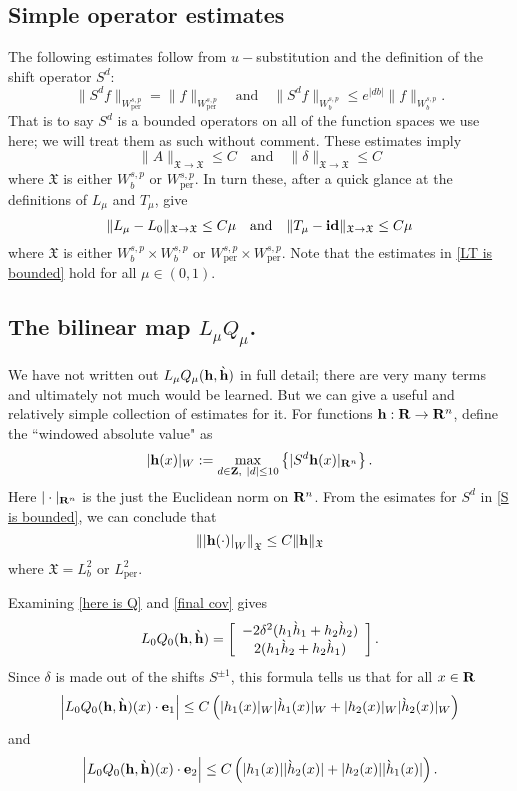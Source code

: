 \documentclass[12pt]{amsart}
\numberwithin{equation}{section}
\newcommand{\per}{{\text{per}}}
\newcommand{\be}{\begin{equation}}
\newcommand{\ee}{\end{equation}}
\newcommand{\mand}{\quad \text{and}\quad}
\newcommand{\R}{{\bf{R}}}
\newcommand{\Z}{{\bf{Z}}}
\newcommand{\hb}{{\bf{h}}}
\newcommand{\hbg}{{\grave{\bf{h}}}}
\newcommand{\hg}{{\grave{h}}}
\newcommand{\jb}{{{\bf{e}}_2}}
\newcommand{\ib}{{{\bf{e}}_1}}
\newcommand{\X}{{\mathfrak{X}}}
\begin{document}
\subsection{Simple operator estimates}
The following estimates follow from $u-$substitution and the definition of the shift operator $S^d$:
\be\label{S is bounded}
\| S^d f\|_{W^{s,p}_\per} 
=
\| f\|_{W^{s,p}_\per} \mand
\| S^d f\|_{W^{s,p}_b} 
\le  e^{|db|}
\| f\|_{W^{s,p}_b}.
\ee
That is to say $S^d$
is a bounded operators on all of the function spaces
we use here; we will treat them as such without comment.
These estimates imply
\be\label{Ad is bounded}
\| A\|_{\X \to \X} \le C
\mand 
\| \delta\|_{\X \to \X} \le C
\ee
where $\X$ is either $W^{s,p}_b$ or $W^{s,p}_\per$. In turn these, after a quick glance at the definitions of $L_\mu$ and $T_\mu$,
give
\be\label{LT is bounded}
\| L_\mu - L_0\|_{\X \to \X} \le C\mu \mand
\| T_\mu - {\bf id}\|_{\X \to \X}\le C\mu
\ee
where $\X$ is either $W^{s,p}_b \times W^{s,p}_b$ or $W^{s,p}_\per \times W^{s,p}_\per$.
Note that the estimates in \eqref{LT is bounded} hold for all $\mu \in (0,1)$.


\subsection{The bilinear map $L_\mu Q_\mu$.}
We have not written out $L_\mu Q_\mu(\hb,\hbg)$ in full detail; 
there are very many terms and ultimately not much would be learned.
But  we can give a useful and relatively simple collection of estimates for it. 
For functions $\hb:\R \to \R^n$, define the ``windowed absolute value" as
$$
|\hb(x)|_W:= \max_{d\in \Z,\ |d| \le 10} \left\{ |S^d\hb(x)|_{\R^n}\right\}.
$$
Here $| \cdot|_{\R^n}$ is the just the Euclidean norm on $\R^n$.
From the esimates for $S^d$ in \eqref{S is bounded}, we can conclude that
\be\label{window 1}
\left \| \left| \hb(\cdot) \right|_W \right \|_{\X} \le C\| \hb \|_{\X}
\ee
where $\X=L^2_b$ or $L^2_\per$.

Examining \eqref{here is Q} and \eqref{final cov}
gives
\be\label{LQ0}
L_0 Q_0(\hb,\hbg) = \left[ \begin{array}{c} -2 \delta^2 (h_1 \hg_1 + h_2 \hg_2) \\
2 (h_1 \hg_2 + h_2 \hg_1)
\end{array}\right].
\ee
Since $\delta$ is made out of the shifts $S^{\pm 1}$, this formula tells us that for all $x \in \R$
\be\label{LQ0i}
\left |L_0 Q_0(\hb,\hbg)(x) \cdot \ib\right| \le C\left( |h_1(x)|_W |\hg_1(x)|_W+|h_2(x)|_W |\hg_2(x)|_W\right)
\ee
and
\be\label{LQ0j}
\left |L_0 Q_0(\hb,\hbg)(x) \cdot \jb\right| \le C\left( |h_1(x)| |\hg_2(x)|+|h_2(x)| |\hg_1(x)|\right).
\ee
\end{document}
